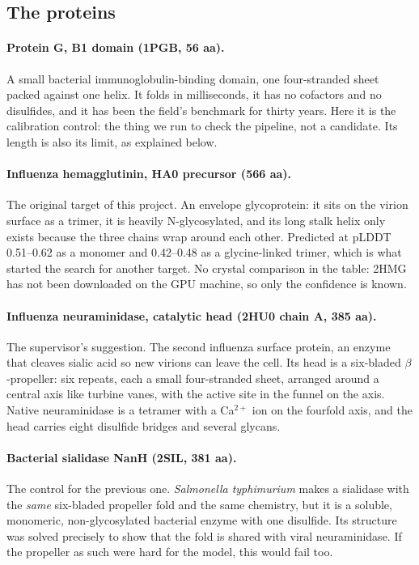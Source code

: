 \documentclass[11pt,a4paper]{article}
\begin{document}
\subsection{The proteins}

\paragraph{Protein G, B1 domain (1PGB, 56 aa).} A small bacterial
immunoglobulin-binding domain, one four-stranded sheet packed against one helix.
It folds in milliseconds, it has no cofactors and no disulfides, and it has been
the field's benchmark for thirty years. Here it is the calibration control: the
thing we run to check the pipeline, not a candidate. Its length is also its
limit, as explained below.

\paragraph{Influenza hemagglutinin, HA0 precursor (566 aa).} The original target
of this project. An envelope glycoprotein: it sits on the virion surface as a
trimer, it is heavily N-glycosylated, and its long stalk helix only exists
because the three chains wrap around each other. Predicted at pLDDT 0.51--0.62
as a monomer and 0.42--0.48 as a glycine-linked trimer, which is what started the
search for another target. No crystal comparison in the table: 2HMG has not been
downloaded on the GPU machine, so only the confidence is known.

\paragraph{Influenza neuraminidase, catalytic head (2HU0 chain A, 385 aa).} The
supervisor's suggestion. The second influenza surface protein, an enzyme that
cleaves sialic acid so new virions can leave the cell. Its head is a six-bladed
$\beta$-propeller: six repeats, each a small four-stranded sheet, arranged around
a central axis like turbine vanes, with the active site in the funnel on the
axis. Native neuraminidase is a tetramer with a Ca$^{2+}$ ion on the fourfold
axis, and the head carries eight disulfide bridges and several glycans.

\paragraph{Bacterial sialidase NanH (2SIL, 381 aa).} The control for the
previous one. \emph{Salmonella typhimurium} makes a sialidase with the
\emph{same} six-bladed propeller fold and the same chemistry, but it is a
soluble, monomeric, non-glycosylated bacterial enzyme with one disulfide. Its
structure was solved precisely to show that the fold is shared with viral
neuraminidase. If the propeller as such were hard for the model, this would fail
too.
\end{document}
